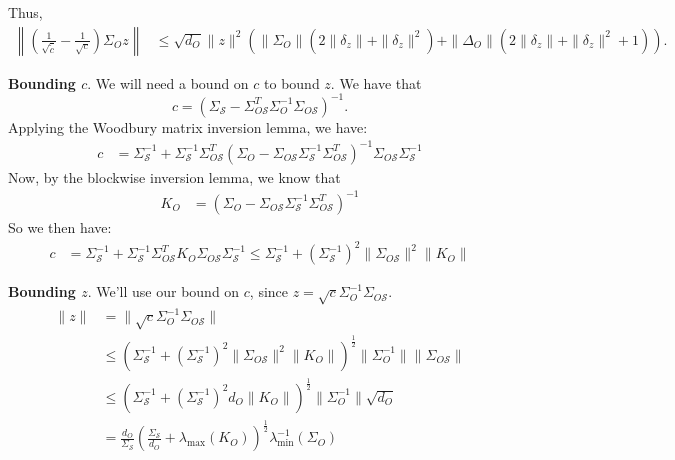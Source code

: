 \documentclass[letterpaper]{article}
\begin{document}
\begin{appendix}
Thus,
\begin{align}
	\left\|\left( \frac{1}{\sqrt{\tilde{c}}} - \frac{1}{\sqrt{c}} \right)\Sigma_Oz \right\|
	&\leq
	\sqrt{d_O}\|z\|^2 \left( 
		\|\Sigma_O\| \left( 2\|\delta_z\| + \|\delta_z\|^2 \right)
		+ \|\Delta_O\| \left( 2\|\delta_z\| + \|\delta_z\|^2 + 1\right)
	\right).
	\label{eq:cterm}
\end{align}

{\bf Bounding $c$}. We will need a bound on $c$ to bound $z$. We have that 
	\[ c = (\Sigma_\mathcal{S}-\Sigma_{O\mathcal{S}}^T \Sigma_O^{-1} \Sigma_{O\mathcal{S}})^{-1}.\]
Applying the Woodbury matrix inversion lemma, we have:
\begin{align*}
	c
	&=
	\Sigma_{\mathcal{S}}^{-1}
	+
	\Sigma_{\mathcal{S}}^{-1} \Sigma_{O\mathcal{S}}^T \left(
		\Sigma_{O} - \Sigma_{O\mathcal{S}}\Sigma_{\mathcal{S}}^{-1}\Sigma_{O\mathcal{S}}^T
	\right)^{-1}
	\Sigma_{O\mathcal{S}}\Sigma_{\mathcal{S}}^{-1}
\end{align*}
Now, by the blockwise inversion lemma, we know that
\begin{align*}
	K_O
	&=
	\left(
		\Sigma_{O} - \Sigma_{O\mathcal{S}}\Sigma_{\mathcal{S}}^{-1}\Sigma_{O\mathcal{S}}^T
	\right)^{-1}
\end{align*}
So we then have:
\begin{align*}
	c
	&=
	\Sigma_{\mathcal{S}}^{-1}
	+
	\Sigma_{\mathcal{S}}^{-1} \Sigma_{O\mathcal{S}}^T K_O \Sigma_{O\mathcal{S}}\Sigma_{\mathcal{S}}^{-1}
	\leq
	\Sigma_{\mathcal{S}}^{-1}
	+
	(\Sigma_{\mathcal{S}}^{-1})^2 \|\Sigma_{O\mathcal{S}}\|^2 \|K_O\|
\end{align*}

{\bf Bounding $z$}. We'll  use our bound on $c$, since $z = \sqrt{c}\Sigma_O^{-1}\Sigma_{O\mathcal{S}}$. 
\begin{align*}
	\|z\|
	&=
	\|\sqrt{c}\Sigma_O^{-1}\Sigma_{O\mathcal{S}}\| \\
	&\leq 
	\left( 
		\Sigma_{\mathcal{S}}^{-1}
		+ (\Sigma_{\mathcal{S}}^{-1})^2 \|\Sigma_{O\mathcal{S}}\|^2 \|K_O\|
	\right)^{\frac12}
	\|\Sigma_O^{-1}\| \|\Sigma_{O\mathcal{S}}\|\\
	&\leq 
	\left( 
		\Sigma_{\mathcal{S}}^{-1}
		+ (\Sigma_{\mathcal{S}}^{-1})^2 d_O \|K_O\|
	\right)^{\frac12}
	\|\Sigma_O^{-1}\| \sqrt{d_O}\\
	&=
	\frac{d_O}{\Sigma_{\mathcal{S}}} \left( 
		\frac{\Sigma_{\mathcal{S}}}{d_O}
		+ \lambda_{\textrm{max}}(K_O)
	\right)^{\frac12}
	\lambda_{\textrm{min}}^{-1}(\Sigma_O)
\end{align*}


\end{appendix}
\end{document}
